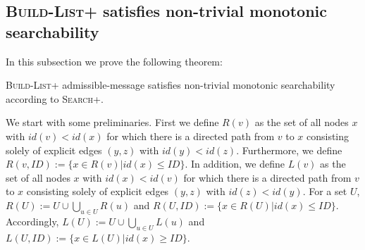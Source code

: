 \documentclass[a4paper,USenglish]{lipics}
\newcommand{\blp}{\textsc{Build-List+}\xspace}
\newcommand{\srp}{\textsc{Search+}\xspace}
\begin{document}
\subsection{\blp satisfies non-trivial monotonic searchability}\label{sec:monotonic_searchability_proof}
In this subsection we prove the following theorem:
\begin{theorem}\label{thm:blp_guarantees_monotonic_searchability}
 \blp admissible-message satisfies non-trivial monotonic searchability according to \srp.
\end{theorem}


We start with some preliminaries.
First we define $R(v)$ as the set of all nodes $x$ with $id(v) < id(x)$ for which there is a directed path from $v$ to $x$ consisting solely of explicit edges $(y,z)$ with $id(y) < id(z)$.
Furthermore, we define $R(v,ID) := \{x \in R(v) | id(x) \leq ID\}$.
In addition, we define $L(v)$ as the set of all nodes $x$ with $id(x) < id(v)$ for which there is a directed path from $v$ to $x$ consisting solely of explicit edges $(y,z)$ with $id(z) < id(y)$.
For a set $U$, $R(U) := U \cup \bigcup_{u \in U}R(u)$ and $R(U,ID) := \{x \in R(U) | id(x) \leq ID\}$.
Accordingly, $L(U) := U \cup \bigcup_{u \in U}L(u)$ and $L(U,ID) := \{x \in L(U) | id(x) \geq ID\}$.
\end{document}
